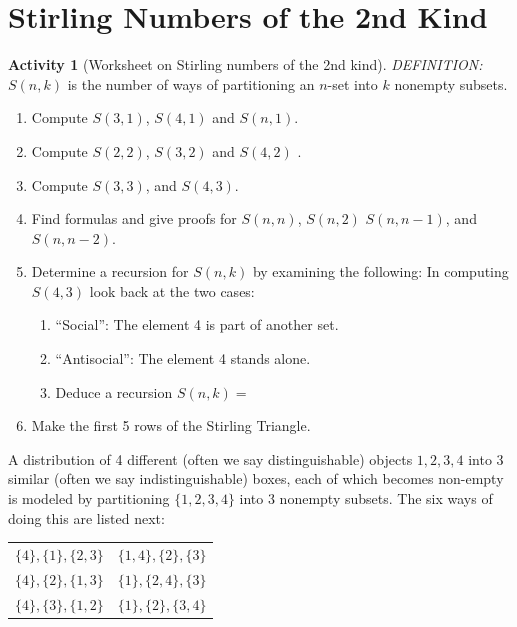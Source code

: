 \documentclass[10pt,]{book}
\theoremstyle{plain}
\theoremstyle{definition}
\theoremstyle{definition}
\theoremstyle{definition}
\newtheorem{activity}[project]{Activity}
\theoremstyle{definition}
\numberwithin{equation}{chapter}
\begin{document}
\section[{Stirling Numbers of the 2nd Kind}]{Stirling Numbers of the 2nd Kind}\label{sec_adv-stirling}
\begin{activity}[Worksheet on Stirling numbers of the 2nd kind]\label{activity-75}
\hypertarget{p-1057}{}%
\emph{DEFINITION:} \(S\left( n,k \right)\) is the number of ways of partitioning an \(n\)-set into \(k\) nonempty subsets.%
\begin{enumerate}[font=\bfseries,label=(\alph*),ref=\alph*]
\item\label{task-102} \hypertarget{p-1058}{}%
Compute \(S(3,1)\), \(S(4,1)\) and \(S(n,1)\).%
\item\label{task-103} \hypertarget{p-1059}{}%
Compute \(S(2,2)\), \(S(3,2)\) and \(S(4,2)\) .%
\item\label{task-104} \hypertarget{p-1060}{}%
Compute \(S(3,3)\), and \(S(4,3)\).%
\item\label{task-105} \hypertarget{p-1061}{}%
Find formulas and give proofs for \(S(n,n)\), \(S(n,2)\) \(S(n,n - 1)\), and \(S(n,n-2)\).%
\item\label{task-106} \hypertarget{p-1062}{}%
Determine a recursion for \(S(n,k)\) by examining the following: In computing \(S\left( 4,3 \right)\) look back at the two cases: \leavevmode%
\begin{enumerate}
\item\hypertarget{li-212}{}\hypertarget{p-1063}{}%
``Social'': The element 4 is part of another set.%
\item\hypertarget{li-213}{}\hypertarget{p-1064}{}%
``Antisocial'': The element 4 stands alone.%
\item\hypertarget{li-214}{}\hypertarget{p-1065}{}%
Deduce a recursion \(S\left( n,k \right) =\)%
\end{enumerate}
%
\item\label{task-107} \hypertarget{p-1066}{}%
Make the first 5 rows of the Stirling Triangle.%
\end{enumerate}
\end{activity}
\hypertarget{p-1067}{}%
A distribution of 4 different (often we say distinguishable) objects \(1,2,3,4\) into 3 similar (often we say indistinguishable) boxes, each of which becomes non-empty is modeled by partitioning \(\{ 1,2,3,4\}\) into 3 nonempty subsets. The six ways of doing this are listed next:%
\begin{sidebyside}{1}{0.25}{0.25}{0}
\begin{sbspanel}{0.5}
{\centering%
\begin{tabular}{ll}
\(\{4\}, \{1\}, \{2,3\}\)&\(\{1,4\}, \{2\}, \{3\}\)\tabularnewline[0pt]
\(\{4\}, \{2\}, \{1,3\}\)&\(\{1\}, \{2,4\}, \{3\}\)\tabularnewline[0pt]
\(\{4\}, \{3\}, \{1,2\}\)&\(\{1\}, \{2\}, \{3,4\}\)
\end{tabular}
\par}
\end{sbspanel}
\end{sidebyside}
\end{document}
